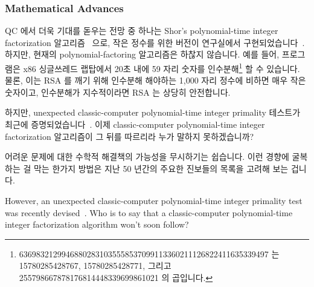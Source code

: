\subsubsection{Mathematical Advances}
\label{sec:future:Mathematical Advances}

QC 에서 더욱 기대를 돋우는 전망 중 하나는 Shor's polynomial-time integer
factorization
알고리즘~\cite{Shor:1997:PAP:264393.264406,WikipediaShorsAlgorithm} 으로, 작은
정수를 위한 버전이 연구실에서
구현되었습니다~\cite{LievenMKVandersypen2001ShorQFactoring}.
하지만, 현재의 polynomial-factoring 알고리즘은 하찮지 않습니다.
예를 들어,  프로그램은 x86 싱글쓰레드 랩탑에서 20초 내에 59 자리
숫자를 인수분해\footnote{
	\scriptsize
	63698321299468802831035558537099113360211126822411635339497 는
	15780285428767, 15780285428771, 그리고
	255798667878176814448339699861021 의 곱입니다.}
할 수 있습니다.
물론, 이는 RSA 를 깨기 위해 인수분해 해야하는 1,000 자리 정수에 비하면 매우
작은 숫자이고, 인수분해가 지수적이라면 RSA 는 상당히 안전합니다.

하지만, unexpected classic-computer polynomial-time integer primality 테스트가
최근에
증명되었습니다~\cite{ManindraAgrawal2004PrimesIsInP,WikipediaAKSPrimalityTest}.
이제 classic-computer polynomial-time integer factorization 알고리즘이 그 뒤를
따르리라 누가 말하지 못하겠습니까?

어려운 문제에 대한 수학적 해결책의 가능성을 무시하기는 쉽습니다.
이런 경향에 굴복하는 걸 막는 한가지 방법은 지난 50 년간의 주요한 진보들의
목록을 고려해 보는 겁니다.
\iffalse

However, an unexpected classic-computer
polynomial-time integer primality test was recently
devised~\cite{ManindraAgrawal2004PrimesIsInP,WikipediaAKSPrimalityTest}.
Who is to say that a classic-computer polynomial-time integer
factorization algorithm won't soon follow?

